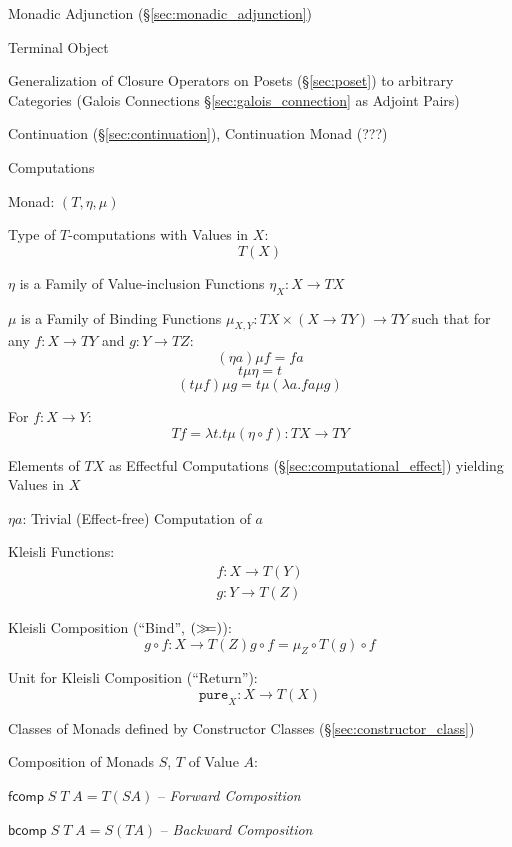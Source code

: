 Monadic Adjunction (\S\ref{sec:monadic_adjunction})

Terminal Object %

Generalization of Closure Operators on Posets (\S\ref{sec:poset}) to
arbitrary Categories (Galois Connections \S\ref{sec:galois_connection}
as Adjoint Pairs)

Continuation (\S\ref{sec:continuation}), Continuation Monad (???) %


\asterism


Computations

Monad: $(T,\eta,\mu)$

Type of $T$-computations with Values in $X$:
\[
  T (X)
\]

$\eta$ is a Family of Value-inclusion Functions $\eta_X : X
\rightarrow T X$

$\mu$ is a Family of Binding Functions $\mu_{X,Y} : T X \times (X
\rightarrow T Y) \rightarrow T Y$ such that for any $f : X \rightarrow
T Y$ and $g : Y \rightarrow T Z$:
\[
 (\eta a) \mu f = f a
\]\[
  t \mu \eta = t
\]\[
  (t \mu f) \mu g = t \mu (\lambda a.f a \mu g)
\]

For $f : X \rightarrow Y$:
\[
  T f = \lambda t.t \mu (\eta \circ f) : T X \rightarrow T Y
\]

Elements of $T X$ as Effectful Computations
(\S\ref{sec:computational_effect}) yielding Values in $X$

$\eta a$: Trivial (Effect-free) Computation of $a$


Kleisli Functions:
\[
\begin{split}
  f : X \rightarrow T(Y) \\
  g : Y \rightarrow T(Z)
\end{split}
\]

Kleisli Composition (``Bind'', $\mathtt{(\mathsf{\gg\kern-3pt=})}$):
\[
  g \circ f : X \rightarrow T(Z)
  g \circ f = \mu_Z \circ T(g) \circ f
\]

Unit for Kleisli Composition (``Return''):
\[
  \mathtt{pure}_X : X \rightarrow T (X)
\]


\asterism

\cite{jones95}

Classes of Monads defined by Constructor Classes
(\S\ref{sec:constructor_class})

Composition of Monads $S$, $T$ of Value $A$:

$\mathsf{fcomp}\;S\;T\;A = T (S A)$ -- \emph{Forward Composition}

$\mathsf{bcomp}\;S\;T\;A = S (T A)$ -- \emph{Backward Composition}

